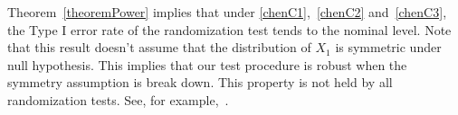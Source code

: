\documentclass[smallcondensed,final,natbib]{svjour3}          %
\DeclareMathOperator{\mytr}{tr}
\begin{document}

Theorem~\ref{theoremPower} implies that under \eqref{chenC1},~\eqref{chenC2} and~\eqref{chenC3}, the Type I error rate of the randomization test tends to the nominal level.
Note that this result doesn't assume that the distribution of $X_1$ is symmetric under null hypothesis.
This implies that our test procedure is robust when the symmetry assumption is break down.
This property is not held by all randomization tests.
See, for example,~\cite{Romano1990On}.



\end{document}
